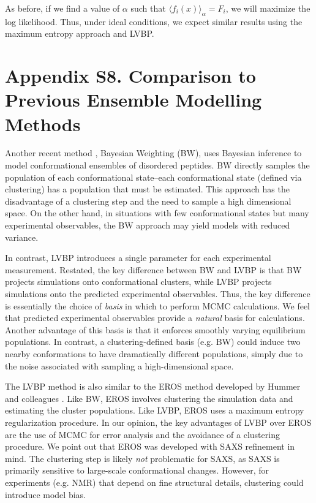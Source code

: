 \documentclass[journal=jacsat,manuscript=article]{achemso}
\begin{document}
As before, if we find a value of $\alpha$ such that $\langle f_i(x) \rangle_\alpha = F_i$, we will maximize the log likelihood.  Thus, under ideal conditions, we expect similar results using the maximum entropy approach and LVBP.  

\clearpage %

\section{Appendix S8.  Comparison to Previous Ensemble Modelling Methods}
  
Another recent method \cite{fisher2010}, Bayesian Weighting (BW), uses Bayesian inference to model conformational ensembles of disordered peptides.  BW directly samples the population of each conformational state--each conformational state (defined via clustering) has a population that must be estimated.  This approach has the disadvantage of a clustering step and the need to sample a high dimensional space. On the other hand, in situations with few conformational states but many experimental observables, the BW approach may yield models with reduced variance. 

In contrast, LVBP introduces a single parameter for each experimental measurement.  Restated, the key difference between BW and LVBP is that BW projects simulations onto conformational clusters, while LVBP projects simulations onto the predicted experimental observables.  Thus, the key difference is essentially the choice of \emph{basis} in which to perform MCMC calculations.  We feel that predicted experimental observables provide a \emph{natural} basis for calculations.  Another advantage of this basis is that it enforces smoothly varying equilibrium populations.  In contrast, a clustering-defined basis (e.g. BW) could induce two nearby conformations to have dramatically different populations, simply due to the noise associated with sampling a high-dimensional space.  

The LVBP method is also similar to the EROS method developed by Hummer and colleagues \cite{rozycki2011saxs}.  Like BW, EROS involves clustering the simulation data and estimating the cluster populations.  Like LVBP, EROS uses a maximum entropy regularization procedure.  In our opinion, the key advantages of LVBP over EROS are the use of MCMC for error analysis and the avoidance of a clustering procedure.  We point out that EROS was developed with SAXS refinement in mind.  The clustering step is likely \emph{not} problematic for SAXS, as SAXS is primarily sensitive to large-scale conformational changes.  However, for experiments (e.g. NMR) that depend on fine structural details, clustering could introduce model bias.  
\end{document}
